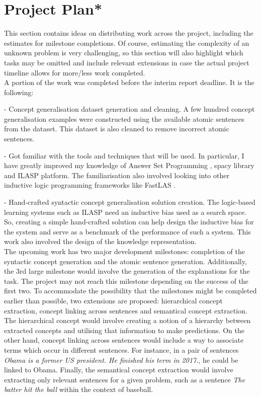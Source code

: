 \chapter{Project Plan*}

This section contains ideas on distributing work across the project, including the estimates for milestone completions.
Of course, estimating the complexity of an unknown problem is very challenging, so this section will also highlight which tasks may be omitted and include relevant extensions in case the actual project timeline allows for more/less work completed.\\

A portion of the work was completed before the interim report deadline. It is the following:

 - Concept generalisation dataset generation and cleaning. A few hundred concept generalisation examples were constructed using the available atomic sentences from the dataset. This dataset is also cleaned to remove incorrect atomic sentences.
 
 - Got familiar with the tools and techniques that will be used. In particular, I have greatly improved my knowledge of Answer Set Programming \cite{RefWorks:RefID:1-lifschitz2008answer}, spacy \cite{RefWorks:RefID:24-spacy} library and ILASP \cite{RefWorks:RefID:18-law2020ilasp} platform. The familiarisation also involved looking into other inductive logic programming frameworks like FastLAS \cite{RefWorks:RefID:19-law2020fastlas:}. 

 - Hand-crafted syntactic concept generalisation solution creation. The logic-based learning systems such as ILASP need an inductive bias used as a search space. So, creating a simple hand-crafted solution can help design the inductive bias for the system and serve as a benchmark of the performance of such a system. This work also involved the design of the knowledge representation.\\
 
 
The upcoming work has two major development milestones: completion of the syntactic concept generation and the atomic sentence generation.
Additionally, the 3rd large milestone would involve the generation of the explanations for the task.
The project may not reach this milestone depending on the success of the first two.
To accommodate the possibility that the milestones might be completed earlier than possible, two extensions are proposed: hierarchical concept extraction, concept linking across sentences and semantical concept extraction.
The hierarchical concept would involve creating a notion of a hierarchy between extracted concepts and utilising that information to make predictions.
On the other hand, concept linking across sentences would include a way to associate terms which occur in different sentences. For instance, in a pair of sentences \emph{Obama is a former US president. He finished his term in 2017.}, he could be linked to Obama.
Finally, the semantical concept extraction would involve extracting only relevant sentences for a given problem, such as a sentence \emph{The batter hit the ball} within the context of baseball.

